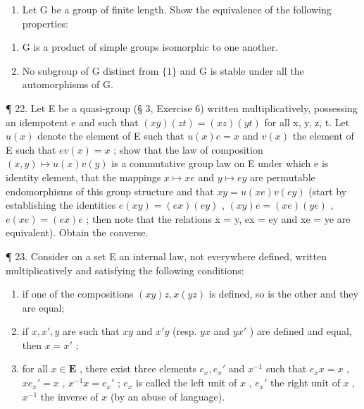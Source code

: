 \begin{enumerate}
\def\labelenumi{\arabic{enumi}.}
\setcounter{enumi}{20}
\tightlist
\item
  Let G be a group of finite length. Show the equivalence of the following properties:
\end{enumerate}

\begin{enumerate}
\def\labelenumi{(\alph{enumi})}
\item
  G is a product of simple groups isomorphic to one another.
\item
  No subgroup of G distinct from \(\{1\}\) and G is stable under all the automorphisms of G.
\end{enumerate}

¶ 22. Let E be a quasi-group (§ 3, Exercise 6) written multiplicatively, possessing an idempotent e and such that \((xy)(zt) = (xz)(yt)\) for all x, y, z, t. Let \(u(x)\) denote the element of E such that \(u(x)e = x\) and \(v(x)\) the element of E such that \(ev(x) = x\) ; show that the law of composition \((x, y) \mapsto u(x)v(y)\) is a commutative group law on E under which e is identity element, that the mappings \(x \mapsto xe\) and \(y \mapsto ey\) are permutable endomorphisms of this group structure and that \(xy = u(xe)v(ey)\) (start by establishing the identities \(e(xy) = (ex)(ey)\) , \((xy)e = (xe)(ye)\) , \(e(xe) = (ex)e\) ; then note that the relations x = y, ex = ey and xe = ye are equivalent). Obtain the converse.

¶ 23. Consider on a set E an internal law, not everywhere defined, written multiplicatively and satisfying the following conditions:

\begin{enumerate}
\def\labelenumi{(\arabic{enumi})}
\item
  if one of the compositions \((xy)z, x(yz)\) is defined, so is the other and they are equal;
\item
  if \(x, x', y\) are such that \(xy\) and \(x'y\) (resp. \(yx\) and \(yx'\) ) are defined and equal, then \(x = x'\) ;
\item
  for all \(x \in \mathbf{E}\) , there exist three elements \(e_x, e_x'\) and \(x^{-1}\) such that \(e_xx = x\) , \(xe_x' = x\) , \(x^{-1}x = e_x'\) ; \(e_x\) is called the left unit of \(x\) , \(e_x'\) the right unit of \(x\) , \(x^{-1}\) the inverse of \(x\) (by an abuse of language).
\end{enumerate}

